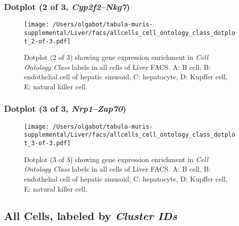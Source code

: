\clearpage

\subsubsection{Dotplot (2 of 3, \emph{Cyp2f2}--\emph{Nkg7})}
\begin{figure}[h]
\centering
\texttt{[image: /Users/olgabot/tabula-muris-supplemental/Liver/facs/allcells\_cell\_ontology\_class\_dotplot\_2-of-3.pdf]}

\caption{ Dotplot (2 of 3)  showing gene expression enrichment in \emph{Cell Ontology Class} labels in all cells of Liver FACS. A: B cell, B: endothelial cell of hepatic sinusoid, C: hepatocyte, D: Kupffer cell, E: natural killer cell.}
\end{figure}


\clearpage

\subsubsection{Dotplot (3 of 3, \emph{Nrp1}--\emph{Zap70})}
\begin{figure}[h]
\centering
\texttt{[image: /Users/olgabot/tabula-muris-supplemental/Liver/facs/allcells\_cell\_ontology\_class\_dotplot\_3-of-3.pdf]}

\caption{ Dotplot (3 of 3)  showing gene expression enrichment in \emph{Cell Ontology Class} labels in all cells of Liver FACS. A: B cell, B: endothelial cell of hepatic sinusoid, C: hepatocyte, D: Kupffer cell, E: natural killer cell.}
\end{figure}


\clearpage

\subsection{All Cells, labeled by \emph{Cluster IDs}}
